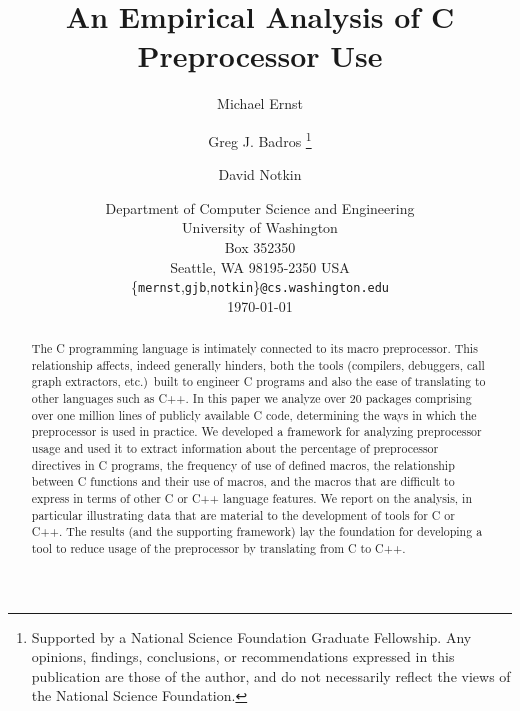 \documentclass[11pt]{article}
\begin{document}
% 


\title{An Empirical Analysis of C Preprocessor Use}

\author{Michael Ernst%
  \and Greg J. Badros%
  \thanks{Supported by a National Science Foundation
    Graduate Fellowship. Any opinions, findings, conclusions, or
    recommendations expressed in this publication are those of the
    author, and do not necessarily reflect the views of the National
    Science Foundation.}
  \and David Notkin}

\date{Department of Computer Science and Engineering \\
University of Washington \\
Box 352350 \\
Seattle, WA  98195-2350  USA \\
{\small \{{\tt mernst},{\tt gjb},{\tt notkin}\}{\tt @cs.washington.edu}} \\
\today}  

\maketitle

\begin{abstract}

  The C programming language is intimately connected to its macro
  preprocessor.  This relationship affects, indeed generally hinders,
  both the tools (compilers, debuggers, call graph extractors, etc.)\ 
  built to engineer C programs and also the ease of translating to other
  languages such as C++.  In this paper we analyze over 20 packages
  comprising over one million lines of publicly available C code,
  determining the ways in which the preprocessor is used in practice.
  We developed a framework for analyzing preprocessor usage and used it to
  extract information about the percentage of preprocessor directives in
  C programs, the frequency of use of defined macros, the relationship
  between C functions and their use of macros, and the macros that are
  difficult to express in terms of other C or C++ language features.  We
  report on the analysis, in particular illustrating data that are
  material to the development of tools for C or C++.  The
  results (and the supporting framework) lay the foundation for
  developing a tool to reduce usage of the preprocessor by translating
  from C to C++.

\end{abstract}
\end{document}
